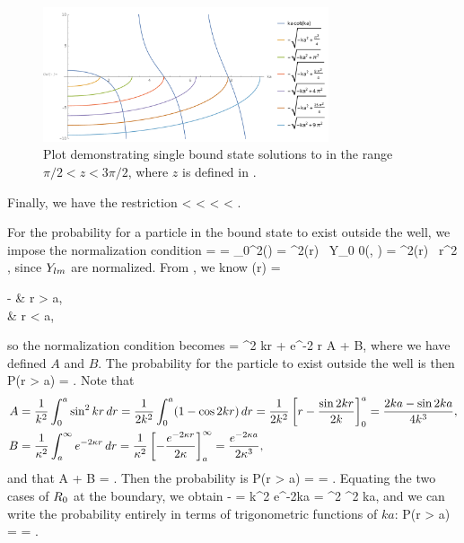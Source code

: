\begin{solution}
	\begin{figure} \centering
		\includegraphics[width=0.75\textwidth]{plot2}
		\caption{Plot demonstrating single bound state solutions to  in the range $\pi/2 < z < 3\pi/2$, where $z$ is defined in .}
		\label{plot2}
	\end{figure}
	
	Finally, we have the restriction
	\beqn \label{range}
		 <  < 
		\qimplies
		 < \Vo < .
	\eeqn
	
	For the probability for a particle in the bound state to exist outside the well, we impose the normalization condition
	 = \braket{\psi}
		= \int \psi_0^2(\vr) \dcx
		= \int \Ro^2(r) \, Y_{0 0}(\tht, \phi) \dcx
		= \intoi \Ro^2(r) \, r^2 \dr,
	\eeq
	since $Y_{l m}$ are normalized.  From , we know
	\beq
		\Ro(r) = \begin{cases}
			- & r > a, \\[2ex]
			 & r < a,
		\end{cases}
	\eeq
	so the normalization condition becomes
	 =  \intoa \sin^2 kr \dr +  \intai e^{-2 \kap r} \dr
		\equiv A + B,
	\eeq
	where we have defined $A$ and $B$.  The probability for the particle to exist outside the well is then
	\beq
		P(r > a) = .
	\eeq
	Note that
	\begin{align*}
		A &= \frac{1}{k^2} \int_0^a \sin^2 kr \dd{r}
		= \frac{1}{2 k^2} \int_0^a (1 - \cos 2kr) \dd{r}
		= \frac{1}{2 k^2} \left[ r - \frac{\sin 2kr}{2k} \right]_0^a
		= \frac{2 ka - \sin 2ka}{4 k^3}, \\
		B &= \frac{1}{\kappa^2} \int_a^\infty e^{-2 \kappa r} \dd{r}
		= \frac{1}{\kappa^2} \left[ -\frac{e^{-2 \kappa r}}{2 \kappa} \right]_a^\infty
		= \frac{e^{-2 \kappa a}}{2 \kappa^3},
	\end{align*}
	and that
	\beq
		A + B = .
	\eeq
	Then the probability is
	\beq
		P(r > a) =  
		= .
	\eeq
	Equating the two cases of $R_0$ at the boundary, we obtain
	\beq
		- = 
		\qimplies
		k^2 e^{-2ka} = \kap^2 \sin^2 ka,
	\eeq
	and we can write the probability entirely in terms of trigonometric functions of $ka$:
	\beq
		P(r > a) = 
		= .
	\eeq
	\vfix
\end{solution}
